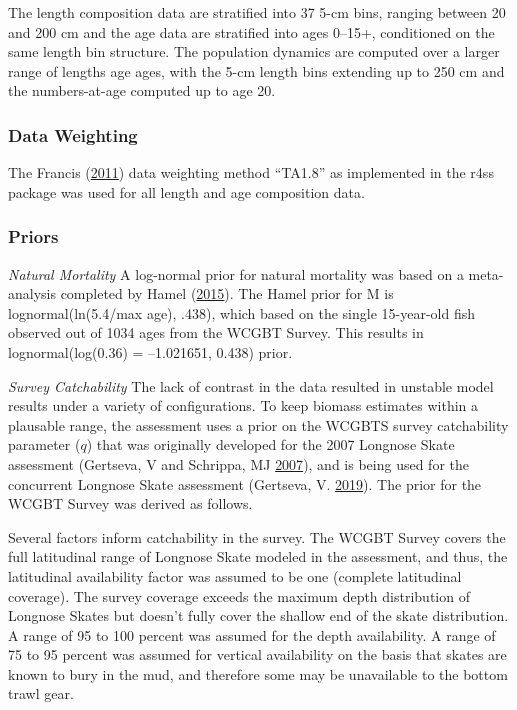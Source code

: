 \documentclass[12pt,]{article}
\begin{document}
The length composition data are stratified into 37 5-cm bins, ranging
between 20 and 200 cm and the age data are stratified into ages 0--15+,
conditioned on the same length bin structure. The population dynamics
are computed over a larger range of lengths age ages, with the 5-cm
length bins extending up to 250 cm and the numbers-at-age computed up to
age 20.

\hypertarget{data-weighting}{%
\subsubsection{Data Weighting}\label{data-weighting}}

The Francis (\protect\hyperlink{ref-Francis2011}{2011}) data weighting
method ``TA1.8'' as implemented in the r4ss package was used for all
length and age composition data.

\hypertarget{priors}{%
\subsubsection{Priors}\label{priors}}

\emph{Natural Mortality} A log-normal prior for natural mortality was
based on a meta-analysis completed by Hamel
(\protect\hyperlink{ref-Hamel2015}{2015}). The Hamel prior for M is
lognormal(ln(5.4/max age), .438), which based on the single 15-year-old
fish observed out of 1034 ages from the WCGBT Survey. This results in
lognormal(log(0.36) = --1.021651, 0.438) prior.

\vspace{.5cm}

\emph{Survey Catchability} The lack of contrast in the data resulted in
unstable model results under a variety of configurations. To keep
biomass estimates within a plausable range, the assessment uses a prior
on the WCGBTS survey catchability parameter (\(q\)) that was originally
developed for the 2007 Longnose Skate assessment (Gertseva, V and
Schrippa, MJ \protect\hyperlink{ref-Gertseva2007}{2007}), and is being
used for the concurrent Longnose Skate assessment (Gertseva, V.
\protect\hyperlink{ref-Gertseva2019}{2019}). The prior for the WCGBT
Survey was derived as follows.

Several factors inform catchability in the survey. The WCGBT Survey
covers the full latitudinal range of Longnose Skate modeled in the
assessment, and thus, the latitudinal availability factor was assumed to
be one (complete latitudinal coverage). The survey coverage exceeds the
maximum depth distribution of Longnose Skates but doesn't fully cover
the shallow end of the skate distribution. A range of 95 to 100 percent
was assumed for the depth availability. A range of 75 to 95 percent was
assumed for vertical availability on the basis that skates are known to
bury in the mud, and therefore some may be unavailable to the bottom
trawl gear.
\end{document}
